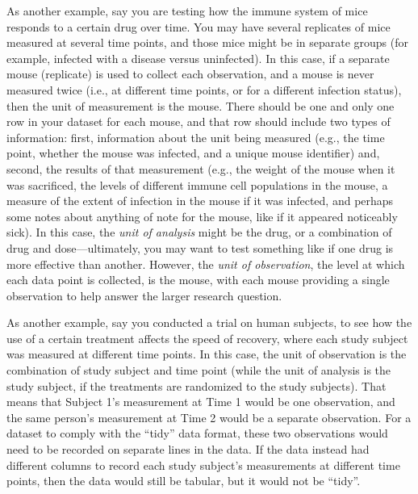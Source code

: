 \documentclass[]{tufte-book}
\begin{document}
As another example, say you are testing how the immune system of mice responds
to a certain drug over time. You may have several replicates of mice measured at
several time points, and those mice might be in separate groups (for example,
infected with a disease versus uninfected). In this case, if a separate mouse
(replicate) is used to collect each observation, and a mouse is never measured
twice (i.e., at different time points, or for a different infection status),
then the unit of measurement is the mouse. There should be one and only one row
in your dataset for each mouse, and that row should include two types of
information: first, information about the unit being measured (e.g., the time
point, whether the mouse was infected, and a unique mouse identifier) and,
second, the results of that measurement (e.g., the weight of the mouse when it
was sacrificed, the levels of different immune cell populations in the mouse, a
measure of the extent of infection in the mouse if it was infected, and perhaps
some notes about anything of note for the mouse, like if it appeared noticeably
sick). In this case, the \emph{unit of analysis} might be the drug, or a combination
of drug and dose---ultimately, you may want to test something like if one drug
is more effective than another. However, the \emph{unit of observation}, the level at
which each data point is collected, is the mouse, with each mouse providing a
single observation to help answer the larger research question.

As another example, say you conducted a trial on human subjects, to see how the
use of a certain treatment affects the speed of recovery, where each study
subject was measured at different time points. In this case, the unit of
observation is the combination of study subject and time point (while the unit
of analysis is the study subject, if the treatments are randomized to the study
subjects). That means that Subject 1's measurement at Time 1 would be one
observation, and the same person's measurement at Time 2 would be a separate
observation. For a dataset to comply with the ``tidy'' data format, these two
observations would need to be recorded on separate lines in the data. If the
data instead had different columns to record each study subject's measurements
at different time points, then the data would still be tabular, but it would not
be ``tidy''.
\end{document}
